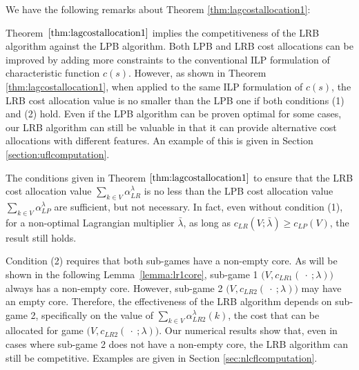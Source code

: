 \documentclass[ijoc,nonblindrev]{informs3} %
\begin{document}
We have the following remarks about Theorem \ref{thm:lagcostallocation1}:
\begin{remark}
Theorem~$\ref{thm:lagcostallocation1}$ implies the competitiveness of the LRB algorithm against the LPB algorithm. Both LPB and LRB cost allocations can be improved by adding more constraints to the conventional ILP formulation of characteristic function $c(s)$. However, as shown in Theorem \ref{thm:lagcostallocation1}, when applied to the same ILP formulation of $c(s)$, the LRB cost allocation value is no smaller than the LPB one if both conditions (1) and (2) hold. Even if the LPB algorithm can be proven optimal for some cases, our LRB algorithm can still be valuable in that it can provide alternative cost allocations with different features. An example of this is given in Section \ref{section:uflcomputation}.
\end{remark}

\begin{remark}
The conditions given in Theorem $\ref{thm:lagcostallocation1}$ to ensure that the LRB cost allocation value $\sum_{k\in V} \alpha_{LR}^{\lambda}$ is no less than the LPB cost allocation value $\sum_{k\in V}\alpha_{LP}^{\lambda}$ are sufficient, but not necessary.
In fact, even without condition (1), for a non-optimal Lagrangian multiplier $\bar{\lambda}$, as long as $c_{LR}(V;\bar{\lambda}) \geq c_{LP}(V)$, the result still holds.
\end{remark}

\begin{remark}\label{rem:remark3}
Condition (2) requires that both sub-games have a non-empty core. As will be shown in the following Lemma~\ref{lemma:lr1core}, sub-game 1 $\big(V,c_{LR1}(\ \cdot\ ;\lambda)\big)$ always has a non-empty core.
However, sub-game 2 $\big(V,c_{LR2}(\ \cdot\ ;\lambda)\big)$ may have an empty core. 
Therefore, the effectiveness of the LRB algorithm depends on sub-game 2, specifically on the value of $\sum_{k \in V} \alpha_{LR2}^{\lambda}(k)$, the cost that can be allocated for game $\big(V,c_{LR2}(\ \cdot \ ;\lambda)\big)$. Our numerical results show that, even in cases where sub-game 2 does not have a non-empty core, the LRB algorithm can still be competitive. Examples are given in Section \ref{sec:nlcflcomputation}.
\end{remark}
\end{document}
